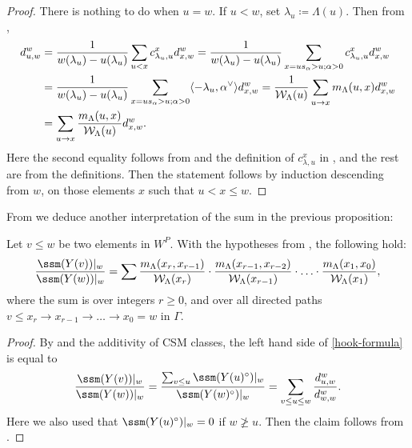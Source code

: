 \begin{proof}
There is nothing to do when $u=w$. If $u<w$, set $\lambda_u\coloneqq  \Lambda(u)$. Then from
,
\[ \begin{split} d_{u,w}^w & = \frac{1}{w(\lambda_u) - u(\lambda_u)} \sum_{u < x} c_{\lambda_u, u}^x d_{x,w}^w
= \frac{1}{w(\lambda_u) - u(\lambda_u)} \sum_{x= us_\alpha >u ; \alpha >0} 
c_{\lambda_u, u}^x d_{x,w}^w
\\ & = \frac{1}{w(\lambda_u) - u(\lambda_u)} \sum_{x= us_\alpha >u ; \alpha >0} \langle -\lambda_u , \alpha^\vee \rangle  d_{x,w}^w = 
\frac{1}{\mathcal{W}_\Lambda(u)} \sum_{u \overset{}{\to} x } m_\Lambda(u,x) d_{x,w}^w \\ &
= \sum_{u \overset{}{\to} x } \frac{m_\Lambda(u,x)}{\mathcal{W}_\Lambda(u)} d_{x,w}^w \/. \end{split}
\] Here the second equality follows from  and the definition of $c_{\lambda, u}^x$ in , and the rest are from the definitions. Then the statement follows
by induction descending from $w$, on those elements $x$ such that $u<x\le w$.
\end{proof}
From  we deduce another interpretation of the sum in the previous proposition:
\begin{corol}\label{thm:LocCSM2} Let $v \le w$ be two elements in $W^P$. 
With the hypotheses from , the following hold:
\begin{equation}\label{hook-formula}
\frac{\ssm(Y(v))|_w}{\ssm(Y(w))|_w} =
\sum
\frac{m_\Lambda(x_r,x_{r-1})}{\mathcal{W}_\Lambda(x_r)}\cdot \frac{m_\Lambda(x_{r-1},x_{r-2})}{\mathcal{W}_\Lambda(x_{r-1})}\cdot \ldots \cdot \frac{m_\Lambda(x_{1},x_{0})}{\mathcal{W}_\Lambda(x_{1})},
\end{equation} where the sum is over integers $r \ge 0$, and over all directed paths 
$v\leq x_r \overset{}{\to} x_{r-1} \overset{}{\to} \ldots \overset{}{\to} x_0 = w$ in $\Gamma$.
\end{corol}
\begin{proof} By  and the additivity of CSM classes, 
the left hand side of \eqref{hook-formula} is equal to 
\[\displaystyle \frac{\ssm(Y(v))|_w}{\ssm(Y(w))|_w}=\frac{\sum_{v\leq u}\ssm(Y(u)^\circ)|_w}{\ssm(Y(w)^\circ)|_w} =\sum_{v\leq u\leq w} \frac{d_{u,w}^{w}}{d_{w,w}^{w}}
\/.
\] 
Here we also used that $\ssm(Y(u)^\circ)|_w=0$ if $w \ngeq u$.
Then the claim follows from .\end{proof}

